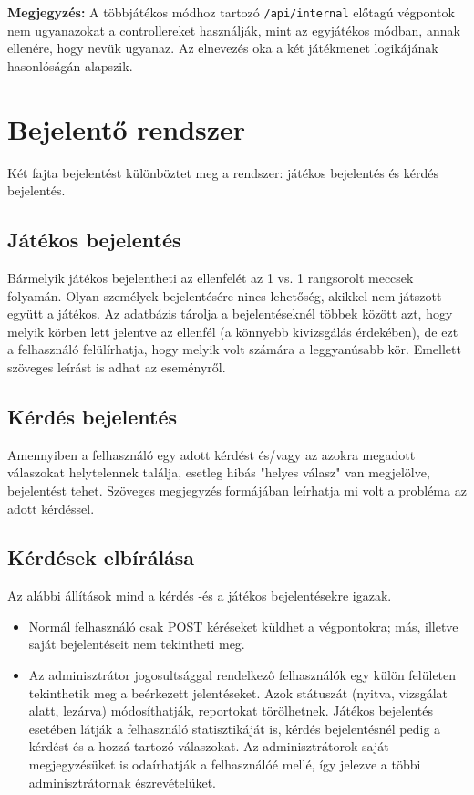 \textbf{Megjegyzés:} A többjátékos módhoz tartozó \texttt{/api/internal} előtagú végpontok nem ugyanazokat a controllereket használják, mint az egyjátékos módban, annak ellenére, hogy nevük ugyanaz. Az elnevezés oka a két játékmenet logikájának hasonlóságán alapszik.


\section{Bejelentő rendszer}
Két fajta bejelentést különböztet meg a rendszer: játékos bejelentés és kérdés bejelentés.

\subsection{Játékos bejelentés}
Bármelyik játékos bejelentheti az ellenfelét az 1 vs. 1 rangsorolt meccsek folyamán. Olyan személyek bejelentésére nincs lehetőség, akikkel nem játszott együtt a játékos. Az adatbázis tárolja a bejelentéseknél többek között azt, hogy melyik körben lett jelentve az ellenfél (a könnyebb kivizsgálás érdekében), de ezt a felhasználó felülírhatja, hogy melyik volt számára a leggyanúsabb kör. Emellett szöveges leírást is adhat az eseményről. 

\subsection{Kérdés bejelentés}
Amennyiben a felhasználó egy adott kérdést és/vagy az azokra megadott válaszokat helytelennek találja, esetleg hibás "helyes válasz" van megjelölve, bejelentést tehet. Szöveges megjegyzés formájában leírhatja mi volt a probléma az adott kérdéssel. 

\subsection{Kérdések elbírálása}
Az alábbi állítások mind a kérdés -és a játékos bejelentésekre igazak.
\begin{itemize}
    \item Normál felhasználó csak POST kéréseket küldhet a végpontokra; más, illetve saját bejelentéseit nem tekintheti meg.
    \item Az adminisztrátor jogosultsággal rendelkező felhasználók egy külön felületen tekinthetik meg a beérkezett jelentéseket. Azok státuszát (nyitva, vizsgálat alatt, lezárva) módosíthatják, reportokat törölhetnek. Játékos bejelentés esetében látják a felhasználó statisztikáját is, kérdés bejelentésnél pedig a kérdést és a hozzá tartozó válaszokat. Az adminisztrátorok saját megjegyzésüket is odaírhatják a felhasználóé mellé, így jelezve a többi adminisztrátornak észrevételüket.
\end{itemize}


